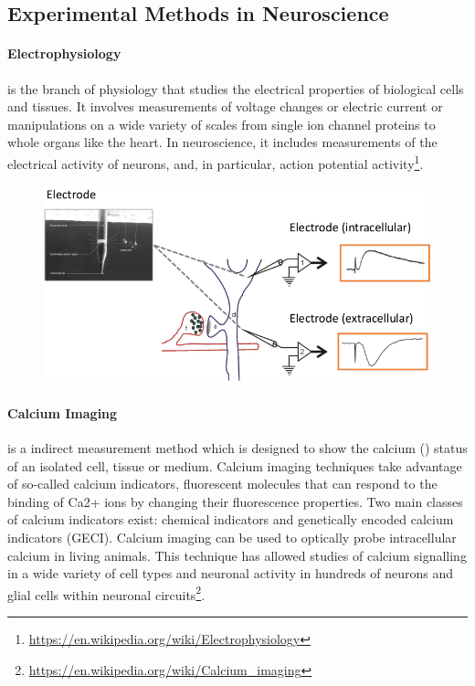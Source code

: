 \documentclass[main]{subfiles}
\begin{document}
\subsection{Experimental Methods in Neuroscience}
\paragraph{Electrophysiology} is the branch of physiology that studies the electrical properties of biological cells and tissues. It involves measurements of voltage changes or electric current or manipulations on a wide variety of scales from single ion channel proteins to whole organs like the heart. In neuroscience, it includes measurements of the electrical activity of neurons, and, in particular, action potential activity\footnote{\url{https://en.wikipedia.org/wiki/Electrophysiology}}.

\begin{figure}[H]
    \centering
    \includegraphics[width=0.99\linewidth]{01_Introduction/figures/electrophysiology.png}
    \caption{}
    \label{fig:basalandcerebellum}
\end{figure}


\paragraph{Calcium Imaging} is a indirect measurement method which is designed to show the calcium () status of an isolated cell, tissue or medium. Calcium imaging techniques take advantage of so-called calcium indicators, fluorescent molecules that can respond to the binding of Ca2+ ions by changing their fluorescence properties. Two main classes of calcium indicators exist: chemical indicators and genetically encoded calcium indicators (GECI). Calcium imaging can be used to optically probe intracellular calcium in living animals. This technique has allowed studies of calcium signalling in a wide variety of cell types and neuronal activity in hundreds of neurons and glial cells within neuronal circuits\footnote{\url{https://en.wikipedia.org/wiki/Calcium_imaging}}. 
\end{document}
